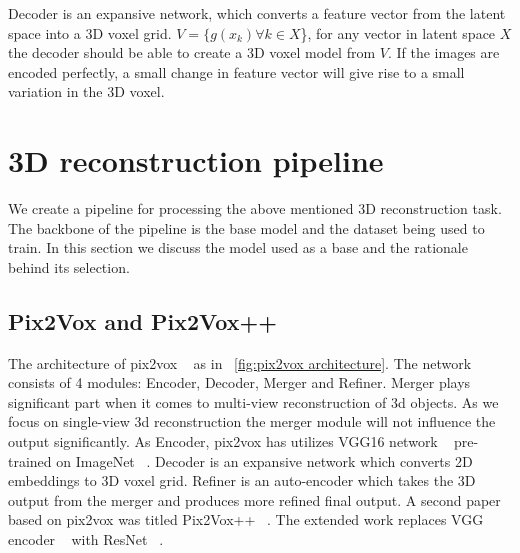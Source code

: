 Decoder is an expansive network, which converts a feature vector from the latent space into a 3D voxel grid.
$V = \{g(x_k) \forall k \in X$\}, for any vector in latent space $X$ the decoder should be able to create a 3D voxel model from $V$.
If the images are encoded perfectly, a small change in feature vector will give rise to a small variation in the 3D voxel.

\section{3D reconstruction pipeline}\label{sec:3D reconstruction pipeline}
We create a pipeline for processing the above mentioned 3D reconstruction task.
The backbone of the pipeline is the base model and the dataset being used to train.
In this section we discuss the model used as a base and the rationale behind its selection.

\subsection{Pix2Vox and Pix2Vox++}
The architecture of pix2vox ~\cite{Xie_2019} as in ~\ref{fig:pix2vox architecture}.
The network consists of 4 modules: Encoder, Decoder, Merger and Refiner.
Merger plays significant part when it comes to multi-view reconstruction of 3d objects.
As we focus on single-view 3d reconstruction the merger module will not influence the output significantly.
As Encoder, pix2vox has utilizes VGG16 network ~\cite{simonyan2015deep} pre-trained on ImageNet ~\cite{Deng2009ImageNetAL}.
Decoder is an expansive network which converts 2D embeddings to 3D voxel grid.
Refiner is an auto-encoder which takes the 3D output from the merger and produces more refined final output.
A second paper based on pix2vox was titled Pix2Vox++ ~\cite{Xie_2020}.
The extended work replaces VGG encoder ~\cite{simonyan2015deep} with ResNet ~\cite{He2016DeepRL}.

